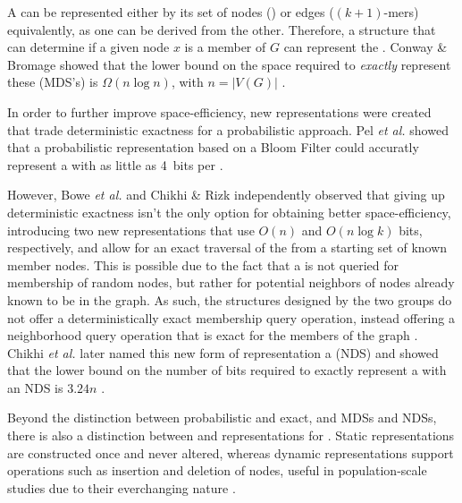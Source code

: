 A \dBG can be represented either by its set of nodes () or edges ($(k+1)$-mers) equivalently, as one can be derived from the other. Therefore, a structure that can determine if a given node $x$ is a member of $G$ can represent the \dBG. Conway \& Bromage showed that the lower bound on the space required to \emph{exactly} represent these  (MDS's) is $\Omega(n \log n)$, with $n=|V(G)|$ \cite{Conway2011}.

In order to further improve space-efficiency, new representations were created that trade deterministic exactness for a probabilistic approach. Pel \emph{et al.} showed that a probabilistic representation based on a Bloom Filter could accuratly represent a \dBG with as little as 4~bits per \kmer \cite{Pell2012}. 

However, Bowe \emph{et al.} \cite{Bowe2012} and Chikhi \& Rizk \cite{Chikhi2013} independently observed that giving up deterministic exactness isn't the only option for obtaining better space-efficiency, introducing two new representations that use $O(n)$ and $O(n \log k)$ bits, respectively, and allow for an exact traversal of the \dBG from a starting set of known member nodes. This is possible due to the fact that a \dBG is not queried for membership of random nodes, but rather for potential neighbors of nodes already known to be in the graph. As such, the structures designed by the two groups do not offer a deterministically exact membership query operation, instead offering a neighborhood query operation that is exact for the members of the graph \cite{Bowe2012, Chikhi2013}. Chikhi \emph{et al.} later named this new form of representation a  (NDS) and showed that the lower bound on the number of bits required to exactly represent a \dBG with an NDS is $3.24n$ \cite{Chikhi2014}.

Beyond the distinction between probabilistic and exact, and MDSs and NDSs, there is also a distinction between  and  representations for \dBG. Static representations are constructed once and never altered, whereas dynamic representations support operations such as insertion and deletion of nodes, useful in population-scale studies due to their everchanging nature \cite{Alipanahi2021}.


